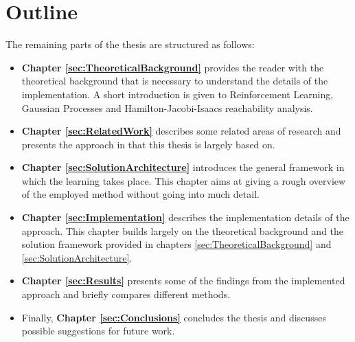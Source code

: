 \documentclass[../main.tex]{subfiles}
\begin{document}
\section{Outline}
The remaining parts of the thesis are structured as follows:
\begin{itemize}
\item \textbf{Chapter \ref{sec:TheoreticalBackground}} provides the reader with the theoretical background that is necessary to understand the details of the implementation. A short introduction is given to Reinforcement Learning, Gaussian Processes and Hamilton-Jacobi-Isaacs reachability analysis.
\item \textbf{Chapter \ref{sec:RelatedWork}} describes some related areas of research and presents the approach in \cite{akametalu2014reachability} that this thesis is largely based on.
\item \textbf{Chapter \ref{sec:SolutionArchitecture}} introduces the general framework in which the learning takes place. This chapter aims at giving a rough overview of the employed method without going into much detail.
\item \textbf{Chapter \ref{sec:Implementation}} describes the implementation details of the approach. This chapter builds largely on the theoretical background and the solution framework provided in chapters \ref{sec:TheoreticalBackground} and \ref{sec:SolutionArchitecture}.
\item  \textbf{Chapter \ref{sec:Results}} presents some of the findings from the implemented approach and briefly compares different methods.
\item Finally, \textbf{Chapter \ref{sec:Conclusions}} concludes the thesis and discusses possible suggestions for future work.
\end{itemize}
\end{document}
